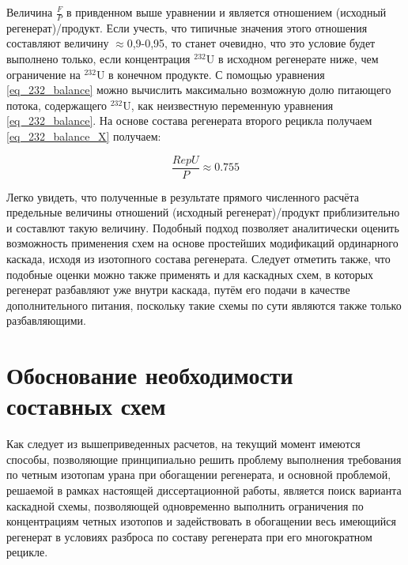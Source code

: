 Величина $\frac{F}{P}$ в привденном выше уравнении и является отношением (исходный регенерат)/продукт. Если учесть, что типичные значения этого отношения составляют величину $\approx$0,9-0,95, то станет очевидно, что это условие будет выполнено только, если концентрация $^{232}$U в исходном регенерате ниже, чем ограничение на $^{232}$U в конечном продукте. 
С помощью уравнения \ref{eq_232_balance} можно вычислить максимально возможную долю питающего потока, содержащего $^{232}$U, как неизвестную переменную уравнения \ref{eq_232_balance}. На основе состава регенерата второго рецикла получаем \ref{eq_232_balance_X} получаем:


\begin{equation}
  \label{eq_232_balance_X}
    \frac{RepU}{P} \approx 0.755
\end{equation}

Легко увидеть, что полученные в результате прямого численного расчёта предельные величины отношений (исходный регенерат)/продукт приблизительно и составлют такую величину. 
Подобный подход позволяет аналитически оценить возможность применения схем на основе простейших модификаций ординарного каскада, исходя из изотопного состава регенерата. Следует отметить также, что подобные оценки можно также применять и для каскадных схем, в которых регенерат разбавляют уже внутри каскада, путём его подачи в качестве дополнительного питания, поскольку такие схемы по сути являются также только разбавляющими.

\section{Обоснование необходимости составных схем}\label{sec:ch2/sec2}

Как следует из вышеприведенных расчетов, на текущий момент имеются способы, позволяющие принципиально решить проблему выполнения требования по четным изотопам урана при обогащении регенерата, и основной проблемой, решаемой в рамках настоящей диссертационной работы, является поиск варианта каскадной схемы, позволяющей одновременно выполнить ограничения по концентрациям четных изотопов и задействовать в обогащении весь имеющийся регенерат в условиях разброса по составу регенерата при его многократном рецикле.

